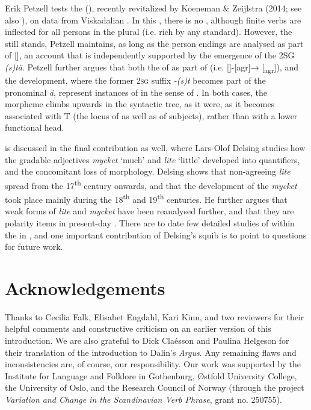 \documentclass[output=paper]{langscibook}
\begin{document}
Erik Petzell tests the  (), recently revitalized by Koeneman \& Zeijlstra (2014; see also \citealt{Tvica2017}), on data from Viskadalian . In this , there is no  , although finite verbs are inflected for all persons in the plural (i.e. rich  by any standard). However, the  still stands, Petzell maintains, as long as the person endings are analysed as part of [], an account that is independently supported by the emergence of the 2SG  \textit{(s)tä}. Petzell further argues that both the  of  as part of  (i.e. []-[agr]→ [\textsubscript{agr}]), and the  development, where the former \textsc{2sg} suffix \textit{{}-(s)t} becomes part of the pronominal  \textit{ä}, represent instances of  in the sense of \citet{RobertsRoussou1999, RobertsRoussou2003}. In both cases, the  morpheme climbs upwards in the syntactic tree, as it were, as it becomes associated with T (the locus of  as well as of subjects), rather than with a lower functional head.



 is discussed in the final contribution as well, where Lars-Olof Delsing studies how the gradable adjectives \textit{mycket} ‘much’ and \textit{lite} ‘little’ developed into quantifiers, and the concomitant loss of  morphology. Delsing shows that non-agreeing \textit{lite} spread from the 17\textsuperscript{th} century onwards, and that the development of the  \textit{mycket} took place mainly during the 18\textsuperscript{th} and 19\textsuperscript{th} centuries. He further argues that weak forms of \textit{lite} and \textit{mycket} have been reanalysed further, and that they are polarity items in present-day . There are to date few detailed studies of  within the  in , and one important contribution of Delsing’s squib is to point to questions for future work.


\section*{Acknowledgements}


Thanks to Cecilia Falk, Elisabet Engdahl, Kari Kinn, and two reviewers for their helpful comments and constructive criticism on an earlier version of this introduction. We are also grateful to Dick Claésson and Paulina Helgeson for their translation of the introduction to Dalin’s \textit{Argus}. Any remaining flaws and inconsistencies are, of course, our responsibility. Our work was supported by the Institute for Language and Folklore in Gothenburg, Østfold University College, the University of Oslo, and the Research Council of Norway (through the project \textit{Variation and Change in the Scandinavian Verb Phrase}, grant no. 250755).
\end{document}
